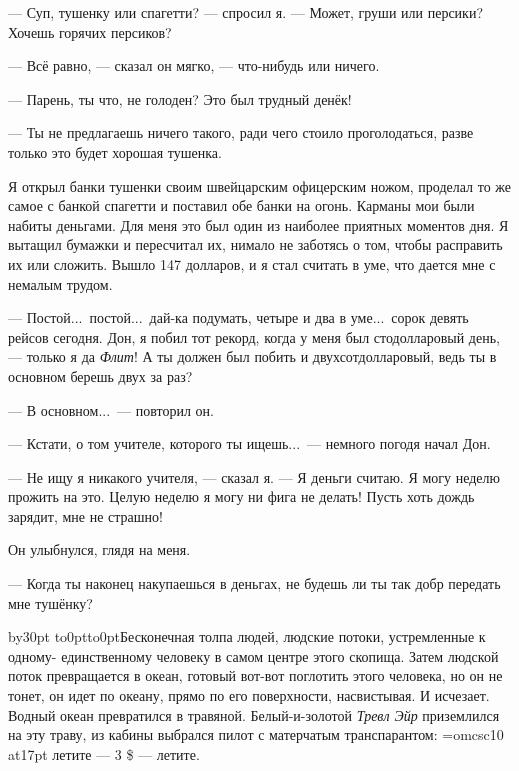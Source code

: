 --- Суп, тушенку или спагетти? --- спросил я. --- Может, груши или персики? Хочешь горячих персиков?

--- Всё равно, --- сказал он мягко, --- что-нибудь или ничего.

--- Парень, ты что, не голоден? Это был трудный денёк!

--- Ты не предлагаешь ничего такого, ради чего стоило проголодаться, разве только это будет хорошая тушенка.

Я открыл банки тушенки своим швейцарским офицерским ножом, проделал то же самое с банкой спагетти и поставил обе банки на огонь. Карманы мои были набиты деньгами. Для меня это был один из наиболее приятных моментов дня. Я вытащил бумажки и пересчитал их, нимало не заботясь о том, чтобы расправить их или сложить. Вышло 147 долларов, и я стал считать в уме, что дается мне с немалым трудом.

--- Постой...\ постой...\ дай-ка подумать, четыре и два в уме...\ сорок девять рейсов сегодня.
Дон, я побил тот рекорд, когда у меня был стодолларовый день, --- только я да {\it Флит\/}!
А ты должен был побить и двухсотдолларовый, ведь ты в основном берешь двух за раз?

--- В основном...\ --- повторил он.

--- Кстати, о том учителе, которого ты ищешь...\ --- немного погодя начал Дон.

--- Не ищу я никакого учителя, --- сказал я. --- Я деньги считаю. Я могу неделю прожить на это. Целую неделю я могу ни фига не делать! Пусть хоть дождь зарядит, мне не страшно!

Он улыбнулся, глядя на меня.

--- Когда ты наконец накупаешься в деньгах, не будешь ли ты так добр передать мне тушёнку?

\vfil\eject

{}
\vskip3cm

\begingroup
\def\par{\endgraf\endgroup}
\advance\parindent by30pt \hang{}
\noindent\vtop to0pt{\kern-8pt\hbox to0pt{\hss\kern\parindent\bukvfont Б\kern3pt}\vss}есконечная
толпа людей, людские потоки, устремленные к одному-\hskip0pt единственному человеку в самом центре этого
скопища. Затем людской поток превращается в океан, готовый вот-вот поглотить этого человека, но
он не тонет, он идет по океану, прямо по его поверхности, насвистывая. И исчезает. Водный океан
превратился в травяной. Белый-и-золотой {\it Тревл Эйр\/} приземлился на эту траву, из кабины выбрался
пилот с матерчатым транспарантом: {\font\csc=omcsc10 at17pt \csc летите --- 3 \$ --- летите}.

